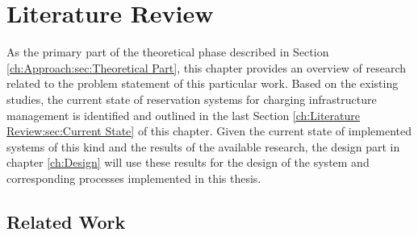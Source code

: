 

\chapter{Literature Review}
\label{ch:Literature Review}

As the primary part of the theoretical phase described in Section \ref{ch:Approach:sec:Theoretical Part}, this chapter provides an overview of research related to the problem statement of this particular work.
Based on the existing studies, the current state of reservation systems for charging infrastructure management is identified and outlined in the last Section \ref{ch:Literature Review:sec:Current State} of this chapter.
Given the current state of implemented systems of this kind and the results of the available research, the design part in chapter \ref{ch:Design} will use these results for the design of the system and corresponding processes implemented in this thesis.

\section{Related Work}
\label{ch:Literature Review:sec:Related Work}

